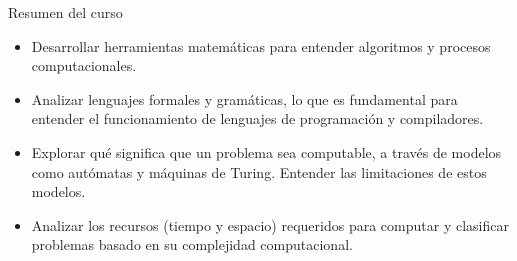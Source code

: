 \documentclass{beamer}
\begin{document}
\begin{frame}{Resumen del curso}
  \begin{itemize}[<+->]
    \item Desarrollar herramientas matemáticas para entender algoritmos y
          procesos computacionales.
    \item Analizar lenguajes formales y gramáticas, lo que es fundamental para
          entender el funcionamiento de lenguajes de programación y
          compiladores.
    \item Explorar qué significa que un problema sea computable, a través de
          modelos como autómatas y máquinas de Turing. Entender las
          limitaciones de estos modelos.
    \item Analizar los recursos (tiempo y espacio) requeridos para computar y
          clasificar problemas basado en su complejidad computacional.
  \end{itemize}
\end{frame}
\end{document}
